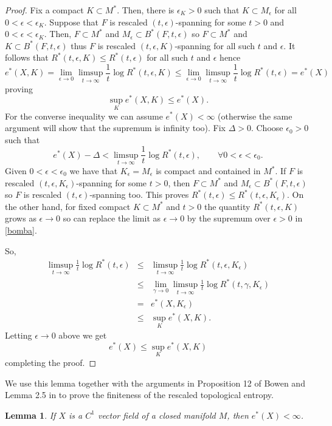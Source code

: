 \documentclass{amsart}
\newtheorem{lem}{Lemma}
\numberwithin{equation}{section}
\begin{document}
\begin{proof}
Fix a compact $K\subset M^*$. Then, there is $\epsilon_K>0$ such that $K\subset M_\epsilon$ for all $0<\epsilon<\epsilon_K$.
Suppose that $F$ is rescaled $(t,\epsilon)$-spanning for some $t>0$ and $0<\epsilon<\epsilon_K$.
Then, $F\subset M^*$ and $M_\epsilon\subset B^*(F,t,\epsilon)$ so
$F\subset M^*$ and $K\subset B^*(F,t,\epsilon)$ thus $F$ is rescaled $(t,\epsilon,K)$-spanning for all such $t$ and $\epsilon$.
It follows that $R^*(t,\epsilon,K)\leq R^*(t,\epsilon)$ for all such $t$ and $\epsilon$
hence
$$
e^*(X,K)=\lim_{\epsilon\to0}\limsup_{t\to\infty}\frac{1}t\log R^*(t,\epsilon,K)\leq \lim_{\epsilon\to0}\limsup_{t\to\infty}\frac{1}t\log R^*(t,\epsilon)=e^*(X)
$$
proving
$$
\sup_K e^*(X,K)\leq e^*(X).
$$
For the converse inequality we can assume $e^*(X)<\infty$ (otherwise the same argument will show that the supremum is infinity too).
Fix $\Delta>0$. Choose $\epsilon_0>0$ such that
$$
e^*(X)-\Delta<\limsup_{t\to\infty}\frac{1}t\log R^*(t,\epsilon),\quad\quad\forall 0<\epsilon<\epsilon_0.
$$
Given $0<\epsilon<\epsilon_0$ we have that $K_\epsilon=M_\epsilon$ is compact and contained in $M^*$. If $F$ is rescaled $(t,\epsilon,K_\epsilon)$-spanning for some $t>0$, then $F\subset M^*$ and $M_\epsilon\subset B^*(F,t,\epsilon)$ so $F$ is rescaled $(t,\epsilon)$-spanning too. This proves $R^*(t,\epsilon)\leq R^*(t,\epsilon,K_\epsilon)$. On the other hand, for fixed compact $K\subset M^*$ and $t>0$ the quantity $R^*(t,\epsilon,K)$ grows as $\epsilon\to0$ so can replace the limit as $\epsilon\to0$ by the supremum over $\epsilon>0$ in \eqref{bomba}.

So,
\begin{eqnarray*}
\limsup_{t\to\infty}\frac{1}t\log R^*(t,\epsilon)&\leq& \limsup_{t\to\infty}\frac{1}t\log R^*(t,\epsilon,K_\epsilon)\\
&\leq& \lim_{\gamma\to0}\limsup_{t\to\infty}\frac{1}t\log R^*(t,\gamma,K_\epsilon)\\
&=& e^*(X,K_\epsilon)\\
&\leq& \sup_K e^*(X,K).
\end{eqnarray*}
Letting $\epsilon\to0$ above we get
$$
e^*(X)\leq \sup_Ke^*(X,K)
$$
completing the proof.
\end{proof}


We use this lemma together with the arguments in Proposition 12 of Bowen \cite{b} and Lemma 2.5 in \cite{hw}  to prove the finiteness of the rescaled topological entropy.

\begin{lem}
\label{perseguido}
If $X$ is a $C^1$ vector field of a closed manifold $M$, then $e^*(X)<\infty$.
\end{lem}
\end{document}
